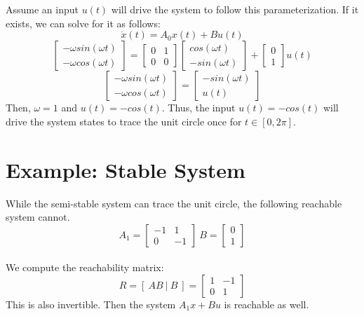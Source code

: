\documentclass[12pt,letterpaper]{article}
\begin{document}
\noindent Assume an input $u(t)$ will drive the system to follow this parameterization. If it exists, we can solve for it as follows:
\[\dot{x}(t) = A_{0}x(t) + Bu(t)\]
\[\begin{bmatrix} -\omega sin(\omega t) \\ -\omega cos(\omega t) \end{bmatrix} = \begin{bmatrix} 0 & 1 \\ 0 & 0 \end{bmatrix} \begin{bmatrix} cos(\omega t) \\ -sin(\omega t) \end{bmatrix} + \begin{bmatrix} 0 \\ 1 \end{bmatrix} u(t) \]
\[\begin{bmatrix} -\omega sin(\omega t) \\ -\omega cos(\omega t) \end{bmatrix} =  \begin{bmatrix} -sin(\omega t) \\ u(t) \end{bmatrix} \]
Then, $\omega = 1$ and $u(t) = -cos(t)$. Thus, the input $u(t) = -cos(t)$ will drive the system states to trace the unit circle once for $t \in [0,2\pi]$.

\section{Example: Stable System}
While the semi-stable system can trace the unit circle, the following reachable system cannot.
\[ A_{1} = \begin{bmatrix} -1 & 1 \\ 0 & -1 \end{bmatrix}\  B = \begin{bmatrix} 0 \\ 1 \end{bmatrix}\]  \\

\noindent We compute the reachability matrix: \[R = [\  AB\ |\ B\ ] = \begin{bmatrix} 1 & -1 \\ 0 & 1 \end{bmatrix}\] This is also invertible. Then the system $A_{1}x + Bu$ is reachable as well. 
\end{document}
